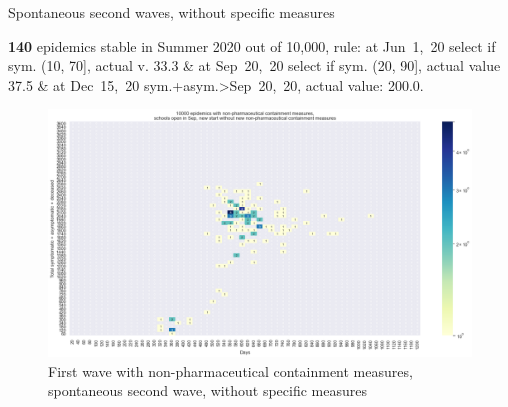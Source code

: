 \documentclass[8pt]{beamer}
\begin{document}
\begin{frame}{Spontaneous second waves, without specific measures}


\textbf{140} {\tiny epidemics stable in Summer 2020 out of 10,000, rule: at Jun~1,~20 select if sym. (10, 70], actual v. 33.3 \& at Sep~20,~20 select if sym. (20, 90], actual value 37.5 \& at Dec~15,~20 sym.+asym.>Sep~20,~20, actual value: 200.0.}

\begin{figure}[H]
\center
\includegraphics[scale=0.17]{10kSpontWave2.png}
\caption{First wave with non-pharmaceutical containment measures, spontaneous second wave, without specific measures}
\label{selSpontWave2}
\end{figure}



\end{frame}
\end{document}
